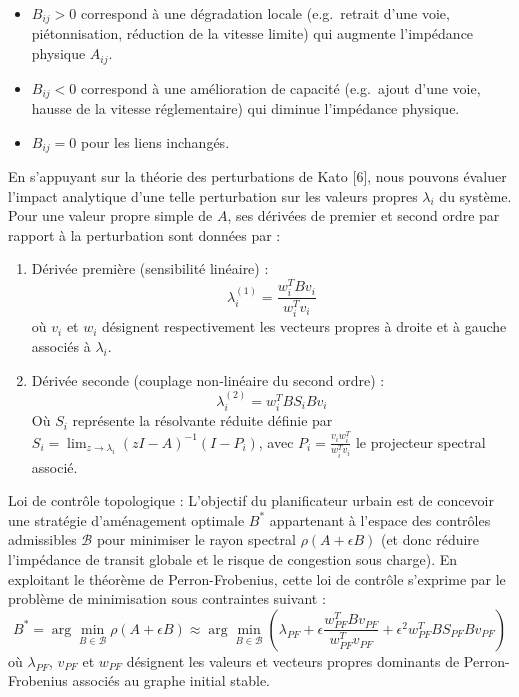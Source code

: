 \documentclass[10pt, a4paper]{article}
\providecommand{\tightlist}{}
\begin{document}
\begin{itemize}
\tightlist
\item
  \(B_{ij} > 0\) correspond à une dégradation locale (e.g.~retrait d'une
  voie, piétonnisation, réduction de la vitesse limite) qui augmente
  l'impédance physique \(A_{ij}\).
\item
  \(B_{ij} < 0\) correspond à une amélioration de capacité (e.g.~ajout
  d'une voie, hausse de la vitesse réglementaire) qui diminue
  l'impédance physique.
\item
  \(B_{ij} = 0\) pour les liens inchangés.
\end{itemize}

En s'appuyant sur la théorie des perturbations de Kato {[}6{]}, nous
pouvons évaluer l'impact analytique d'une telle perturbation sur les
valeurs propres \(\lambda_i\) du système. Pour une valeur propre simple
de \(A\), ses dérivées de premier et second ordre par rapport à la
perturbation sont données par :

\begin{enumerate}
\def\labelenumi{\arabic{enumi}.}
\item
  Dérivée première (sensibilité linéaire) :
  \[\lambda_i^{(1)} = \frac{w_i^T B v_i}{w_i^T v_i}\] où \(v_i\) et
  \(w_i\) désignent respectivement les vecteurs propres à droite et à
  gauche associés à \(\lambda_i\).
\item
  Dérivée seconde (couplage non-linéaire du second ordre) :
  \[\lambda_i^{(2)} = w_i^T B S_i B v_i\] Où \(S_i\) représente la
  résolvante réduite définie par
  \(S_i = \lim_{z \to \lambda_i} (zI - A)^{-1}(I - P_i)\), avec
  \(P_i = \frac{v_i w_i^T}{w_i^T v_i}\) le projecteur spectral associé.
\end{enumerate}

Loi de contrôle topologique : L'objectif du planificateur urbain est de
concevoir une stratégie d'aménagement optimale \(B^*\) appartenant à
l'espace des contrôles admissibles \(\mathcal{B}\) pour minimiser le
rayon spectral \(\rho(A + \epsilon B)\) (et donc réduire l'impédance de
transit globale et le risque de congestion sous charge). En exploitant
le théorème de Perron-Frobenius, cette loi de contrôle s'exprime par le
problème de minimisation sous contraintes suivant :
\[B^* = \arg\min_{B \in \mathcal{B}} \rho(A + \epsilon B) \approx \arg\min_{B \in \mathcal{B}} \left( \lambda_{PF} + \epsilon \frac{w_{PF}^T B v_{PF}}{w_{PF}^T v_{PF}} + \epsilon^2 w_{PF}^T B S_{PF} B v_{PF} \right)\]
où \(\lambda_{PF}\), \(v_{PF}\) et \(w_{PF}\) désignent les valeurs et
vecteurs propres dominants de Perron-Frobenius associés au graphe
initial stable.
\end{document}

